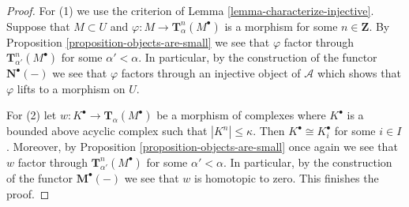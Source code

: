\documentclass{amsart}
\theoremstyle{plain}
\theoremstyle{definition}
\theoremstyle{remark}
\numberwithin{equation}{subsection}
\begin{document}
\begin{proof}
\medskip\noindent
For (1) we use the criterion of
Lemma \ref{lemma-characterize-injective}.
Suppose that $M \subset U$ and $\varphi : M \to \mathbf{T}^n_\alpha(M^\bullet)$
is a morphism for some $n \in \mathbf{Z}$. By
Proposition \ref{proposition-objects-are-small}
we see that $\varphi$ factor through
$\mathbf{T}^n_{\alpha'}(M^\bullet)$ for some $\alpha' < \alpha$.
In particular, by the construction of the functor
$\mathbf{N}^\bullet(-)$ we see that $\varphi$ factors through
an injective object of $\mathcal{A}$ which shows that $\varphi$
lifts to a morphism on $U$.

\medskip\noindent
For (2) let $w : K^\bullet  \to \mathbf{T}_\alpha(M^\bullet)$
be a morphism of complexes where $K^\bullet$ is a bounded above acyclic
complex such that $|K^n| \leq \kappa$. Then $K^\bullet \cong K_i^\bullet$
for some $i \in I$. Moreover, by
Proposition \ref{proposition-objects-are-small}
once again we see that $w$ factor through
$\mathbf{T}^n_{\alpha'}(M^\bullet)$ for some $\alpha' < \alpha$.
In particular, by the construction of the functor
$\mathbf{M}^\bullet(-)$ we see that $w$ is homotopic to zero.
This finishes the proof.
\end{proof}
\end{document}
